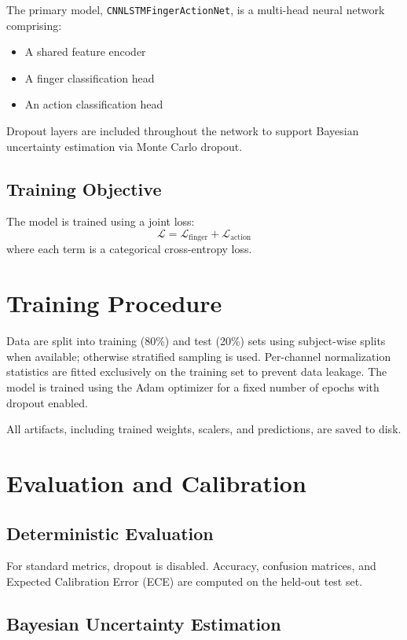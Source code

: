 \documentclass[11pt]{article}
\begin{document}
The primary model, \texttt{CNNLSTMFingerActionNet}, is a multi-head neural network comprising:
\begin{itemize}
    \item A shared feature encoder
    \item A finger classification head
    \item An action classification head
\end{itemize}

Dropout layers are included throughout the network to support Bayesian uncertainty estimation via Monte Carlo dropout.

\subsection{Training Objective}

The model is trained using a joint loss:
\[
\mathcal{L} = \mathcal{L}_{\text{finger}} + \mathcal{L}_{\text{action}}
\]
where each term is a categorical cross-entropy loss.

\section{Training Procedure}

Data are split into training (80\%) and test (20\%) sets using subject-wise splits when available; otherwise stratified sampling is used. Per-channel normalization statistics are fitted exclusively on the training set to prevent data leakage. The model is trained using the Adam optimizer for a fixed number of epochs with dropout enabled.

All artifacts, including trained weights, scalers, and predictions, are saved to disk.

\section{Evaluation and Calibration}

\subsection{Deterministic Evaluation}

For standard metrics, dropout is disabled. Accuracy, confusion matrices, and Expected Calibration Error (ECE) are computed on the held-out test set.

\subsection{Bayesian Uncertainty Estimation}
\end{document}
